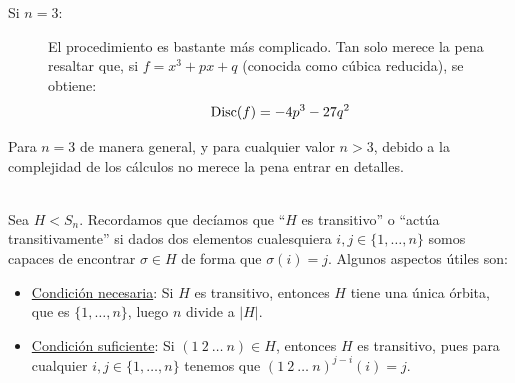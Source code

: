 \begin{ejemplo}
\begin{description}
        \item[Si $n=3$:] El procedimiento es bastante más complicado. Tan solo merece la pena resaltar que, si $f = x^3 + px + q$ (conocida como cúbica reducida), se obtiene:
        \begin{equation*}
            \operatorname{Disc}(f) = -4p^3 - 27q^2
        \end{equation*}
    \end{description}

    Para $n=3$ de manera general, y para cualquier valor $n>3$, debido a la complejidad de los cálculos no merece la pena entrar en detalles.
\end{ejemplo}~\\

\noindent
Sea $H<S_n$. Recordamos que decíamos que ``$H$ es transitivo'' o ``actúa transitivamente'' si dados dos elementos cualesquiera $i,j\in \{1,\ldots,n\}$ somos capaces de encontrar $\sigma \in H$ de forma que $\sigma(i) = j$. Algunos aspectos útiles son:
\begin{itemize}
    \item \ul{Condición necesaria}: Si $H$ es transitivo, entonces $H$ tiene una única órbita, que es $\{1,\ldots,n\}$, luego $n$ divide a $|H|$.
    \item \ul{Condición suficiente}: Si $(1\ 2\ \ldots\ n)\in H$, entonces $H$ es transitivo, pues para cualquier $i,j\in \{1,\ldots,n\}$ tenemos que $(1\ 2\ \ldots\ n)^{j-i}(i) = j$.
\end{itemize}

